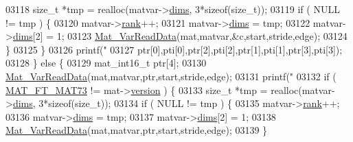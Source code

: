\begin{DoxyCode}
{{{{{{{{{{{{{{{{{{{{{{{{{{{{{{{{{{{{{{{{{{{{{03118                             \textcolor{keywordtype}{size\_t} *tmp = realloc(matvar->\hyperlink{group___m_a_t_a8e01234e1c862ce3472bb37f5a09b92c}{dims}, 3*\textcolor{keyword}{sizeof}(\textcolor{keywordtype}{size\_t}));
03119                             \textcolor{keywordflow}{if} ( NULL != tmp ) \{
03120                                 matvar->\hyperlink{group___m_a_t_a84ba70c96ded13cc555fa75b768d9921}{rank}++;
03121                                 matvar->\hyperlink{group___m_a_t_a8e01234e1c862ce3472bb37f5a09b92c}{dims} = tmp;
03122                                 matvar->\hyperlink{group___m_a_t_a8e01234e1c862ce3472bb37f5a09b92c}{dims}[2] = 1;
03123                                 \hyperlink{group___m_a_t_ga1845000f4fc6252ec5ff11c4b9f0759f}{Mat\_VarReadData}(mat,matvar,&c,start,stride,edge);
03124                             \}
03125                         \}
03126                         printf(\textcolor{stringliteral}{"%
03127                             ptr[0],pti[0],ptr[2],pti[2],ptr[1],pti[1],ptr[3],pti[3]);
03128                     \} \textcolor{keywordflow}{else} \{
03129                         mat\_int16\_t ptr[4];
03130                         \hyperlink{group___m_a_t_ga1845000f4fc6252ec5ff11c4b9f0759f}{Mat\_VarReadData}(mat,matvar,ptr,start,stride,edge);
03131                         printf(\textcolor{stringliteral}{"%
03132                         \textcolor{keywordflow}{if} ( \hyperlink{group___m_a_t_ggad03442b8378999189d510e3745c702b7a765c5d1d5038947646260dc82483517e}{MAT\_FT\_MAT73} != mat->\hyperlink{struct__mat__t_a729c2bc0afc97485057a5af425635b1a}{version} ) \{
03133                             \textcolor{keywordtype}{size\_t} *tmp = realloc(matvar->\hyperlink{group___m_a_t_a8e01234e1c862ce3472bb37f5a09b92c}{dims}, 3*\textcolor{keyword}{sizeof}(\textcolor{keywordtype}{size\_t}));
03134                             \textcolor{keywordflow}{if} ( NULL != tmp ) \{
03135                                 matvar->\hyperlink{group___m_a_t_a84ba70c96ded13cc555fa75b768d9921}{rank}++;
03136                                 matvar->\hyperlink{group___m_a_t_a8e01234e1c862ce3472bb37f5a09b92c}{dims} = tmp;
03137                                 matvar->\hyperlink{group___m_a_t_a8e01234e1c862ce3472bb37f5a09b92c}{dims}[2] = 1;
03138                                 \hyperlink{group___m_a_t_ga1845000f4fc6252ec5ff11c4b9f0759f}{Mat\_VarReadData}(mat,matvar,ptr,start,stride,edge);
03139                             \}
}}}}}}}}}}}}}}}}}}}}}}}}}}}}}}}}}}}}}}}}}}}}}}}
\end{DoxyCode}
